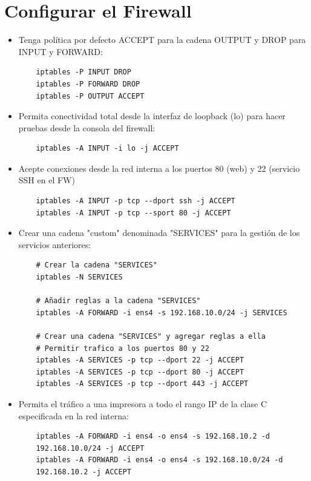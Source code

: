 \documentclass{report}
\begin{document}
\chapter{Configurar el Firewall}
\begin{itemize}
  \item Tenga política por defecto ACCEPT para la cadena OUTPUT y DROP para INPUT y FORWARD:

  \begin{verbatim}
    iptables -P INPUT DROP
    iptables -P FORWARD DROP
    iptables -P OUTPUT ACCEPT
  \end{verbatim}
  
  \item Permita conectividad total desde la interfaz de loopback (lo) para hacer pruebas desde la consola del firewall:
  
  \begin{verbatim}
    iptables -A INPUT -i lo -j ACCEPT
  \end{verbatim}
  
  \item Acepte conexiones desde la red interna a los puertos 80 (web) y 22 (servicio SSH en el FW)
  
  \begin{verbatim}
    iptables -A INPUT -p tcp --dport ssh -j ACCEPT
    iptables -A INPUT -p tcp --sport 80 -j ACCEPT
  \end{verbatim}
  
  \item Crear una cadena "custom" denominada "SERVICES" para la gestión de los servicios anteriores:
  
  \begin{verbatim}
    # Crear la cadena "SERVICES"
    iptables -N SERVICES
  
    # Añadir reglas a la cadena "SERVICES"
    iptables -A FORWARD -i ens4 -s 192.168.10.0/24 -j SERVICES
  
    # Crear una cadena "SERVICES" y agregar reglas a ella
    # Permitir trafico a los puertos 80 y 22
    iptables -A SERVICES -p tcp --dport 22 -j ACCEPT
    iptables -A SERVICES -p tcp --dport 80 -j ACCEPT
    iptables -A SERVICES -p tcp --dport 443 -j ACCEPT
  \end{verbatim}
  
  \item Permita el tráfico a una impresora a todo el rango IP de la clase C especificada en la red interna:
  
  \begin{verbatim}
    iptables -A FORWARD -i ens4 -o ens4 -s 192.168.10.2 -d
    192.168.10.0/24 -j ACCEPT
    iptables -A FORWARD -i ens4 -o ens4 -s 192.168.10.0/24 -d
    192.168.10.2 -j ACCEPT
  \end{verbatim}
\end{itemize}
\end{document}
